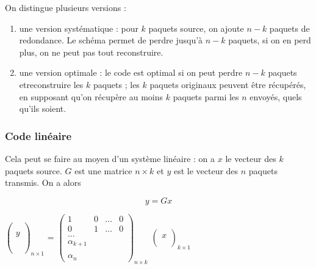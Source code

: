 			On distingue plusieurs versions :
			
			\begin{enumerate}
				\item une version systématique : pour $k$ paquets source, on ajoute $n - k$ paquets de redondance. Le schéma permet de perdre jusqu'à $n - k$ paquets, si on en perd plus, on ne peut pas tout reconstruire.
			
				\item une version optimale : le code est optimal si on peut perdre $n - k$ paquets etreconstruire les $k$ paquets ; les $k$ paquets originaux peuvent être récupérés, en supposant qu'on récupère au moins $k$ paquets parmi les $n$ envoyés, quels qu'ils soient.
			
			\end{enumerate}
				
					
			\subsubsection{Code linéaire}
			Cela peut se faire au moyen d'un système linéaire : on a $x$ le vecteur des $k$ paquets source. $G$ est une matrice $n \times k$ et $y$ est le vecteur des $n$ paquets transmis. On a alors


			$$y = G x$$
			
			\begin{center}
$	
\begin{pmatrix}
 \\ 
 \\
y \\
 \\ 
 \\
 \\
\end{pmatrix}_{n \times 1}$ = $\begin{pmatrix}
1 & 0 & \dots & 0 \\ 
0 & 1 & \dots & 0 \\ 
\dots &   &   &   \\ 
\alpha_{k + 1} &   &   &   \\ 
  &   &   &   \\ 
\alpha_n &   &   &  
\end{pmatrix}_{n \times k}$ $\begin{pmatrix}
  \\ 
x \\ 
 \\
\end{pmatrix}_{k \times 1}
$
\end{center}

